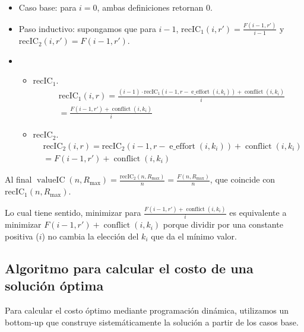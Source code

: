 \begin{itemize}
	\item Caso base: para $i = 0$, ambas definiciones retornan $0$.

	\item Paso inductivo: supongamos que para $i - 1$, $\operatorname{ { recIC }_1 }(i,r') = \frac{ F(i - 1,r') }{ i - 1 }$ y $\operatorname{ { recIC }_2 }(i,r') =F(i - 1,r')$.

	\item \begin{itemize}
			\item $\operatorname{ { recIC }_1 }$.
			\begin{align}
				& \operatorname{ { recIC }_1 }(i,r) = \frac{ (i - 1) \cdot \operatorname{ { recIC }_1 }(i - 1,r - \operatorname{ e\_effort }(i,k_i)) + \operatorname{ conflict }(i,k_i) }{ i } \\
				& = \frac{ F(i - 1,r') + \operatorname{ conflict }(i,k_i) }{ i }
			\end{align}
			\item $\operatorname{ { recIC }_2 }$.
			\begin{align}
				& \operatorname{ { recIC }_2 }(i,r) = \operatorname{ { recIC }_2 }(i - 1,r - \operatorname{ e\_effort }(i,k_i)) + \operatorname{ conflict }(i,k_i) \\
				& = F(i - 1,r') + \operatorname{ conflict }(i,k_i)
			\end{align}
		\end{itemize}
\end{itemize}

Al final $\operatorname{ valueIC }(n,R_{ \max }) = \frac{ \operatorname{ { recIC }_2 }(n,R_{ \max }) }{ n } = \frac{ F(n,R_{ \max }) }{ n }$, que coincide con $\operatorname{ { recIC }_1 }(n,R_{ \max })$.

Lo cual tiene sentido, minimizar para $\frac{ F(i - 1,r') + \operatorname{ conflict }(i,k_i) }{ i }$ es equivalente a minimizar $F(i - 1,r') + \operatorname{ conflict }(i,k_i)$ porque dividir por una constante positiva ($i$) no cambia la elección del $k_i$ que da el mínimo valor.

\subsection{Algoritmo para calcular el costo de una solución óptima}

Para calcular el costo óptimo mediante programación dinámica, utilizamos un bottom-up que construye sistemáticamente la solución a partir de los casos base.

